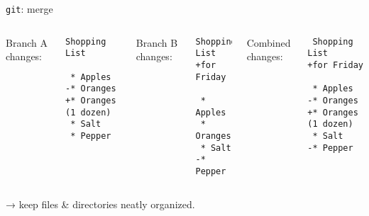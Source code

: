 \documentclass[12pt,aspectratio=169]{beamer}
\begin{document}
\begin{frame}[fragile]{\texttt{git}: merge}
  \begin{columns}[t]
    \column{0.3\paperwidth}
    Branch A changes:

    \begin{verbatim}
Shopping List

 * Apples
-* Oranges
+* Oranges (1 dozen)
 * Salt
 * Pepper
\end{verbatim}

    \column{0.3\paperwidth}
    Branch B changes:

    \begin{verbatim}
Shopping List
+for Friday

 * Apples
 * Oranges
 * Salt
-* Pepper
\end{verbatim}

    \column{0.3\paperwidth}
    Combined changes:

    \begin{verbatim}
 Shopping List
+for Friday

 * Apples
-* Oranges
+* Oranges (1 dozen)
 * Salt
-* Pepper
\end{verbatim}

  \end{columns}

  → keep files \& directories neatly organized.
\end{frame}
\end{document}
